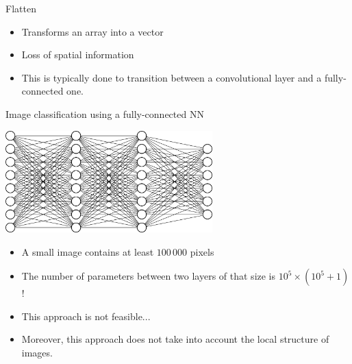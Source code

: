 \documentclass[xcolor=pdftex,dvipsnames,table,mathserif]{beamer}
\begin{document}
\begin{frame}{Flatten}

  \begin{itemize}
  \item Transforms an array into a vector
  \item Loss of spatial information
  \item This is typically done to transition between a convolutional layer and a fully-connected one.
  \end{itemize}

\end{frame}



\begin{frame}{Image classification using a fully-connected NN}

  \centering
  \includegraphics[width=0.6\textwidth]{mini_reseau3_bis}

  \begin{itemize}[<+->]
  \item A small image contains at least $100\,000$ pixels
  \item The number of parameters between two layers of that size is $10^5 \times (10^5 + 1)$!
  \item This approach is not feasible...
  \item Moreover, this approach does not take into account the local structure of images.
  \end{itemize}

\end{frame}
\end{document}
